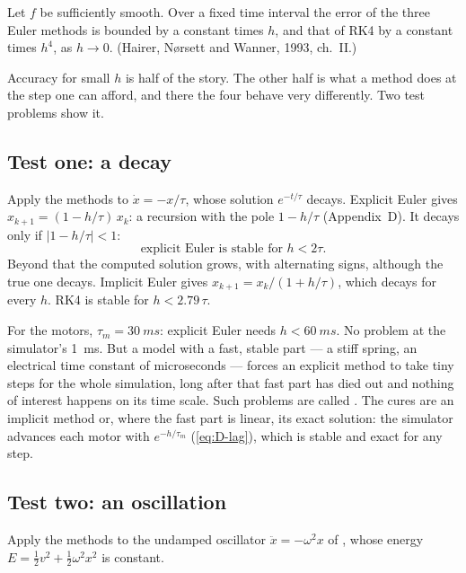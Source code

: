 \begin{theorem}
\label{thm:F-order}
Let $f$ be sufficiently smooth. Over a fixed time interval the error of the three Euler methods is bounded by a constant times $h$, and that of RK4 by a constant times $h^4$, as $h \to 0$. (Hairer, Nørsett and Wanner, 1993, ch.~II.)
\end{theorem}

Accuracy for small $h$ is half of the story. The other half is what a method does at the step one can afford, and there the four behave very differently. Two test problems show it.

\subsection{Test one: a decay}
Apply the methods to $\dot x = -x/\tau$, whose solution $e^{-t/\tau}$ decays. Explicit Euler gives $x_{k+1} = (1 - h/\tau)\,x_k$: a recursion with the pole $1 - h/\tau$ (Appendix~D). It decays only if $|1 - h/\tau| < 1$:
\begin{equation}\label{eq:F-stab}
  \text{explicit Euler is stable for } h < 2\tau .
\end{equation}
Beyond that the computed solution grows, with alternating signs, although the true one decays. Implicit Euler gives $x_{k+1} = x_k/(1 + h/\tau)$, which decays for every $h$. RK4 is stable for $h < 2.79\,\tau$.

For the motors, $\tau_m = \SI{30}{ms}$: explicit Euler needs $h < \SI{60}{ms}$. No problem at the simulator's \SI{1}{ms}. But a model with a fast, stable part — a stiff spring, an electrical time constant of microseconds — forces an explicit method to take tiny steps for the whole simulation, long after that fast part has died out and nothing of interest happens on its time scale. Such problems are called . The cures are an implicit method or, where the fast part is linear, its exact solution: the simulator advances each motor with $e^{-h/\tau_m}$ (\cref{eq:D-lag}), which is stable and exact for any step.

\subsection{Test two: an oscillation}
Apply the methods to the undamped oscillator $\ddot x = -\omega^2x$ of , whose energy $E = \tfrac12v^2 + \tfrac12\omega^2x^2$ is constant.

